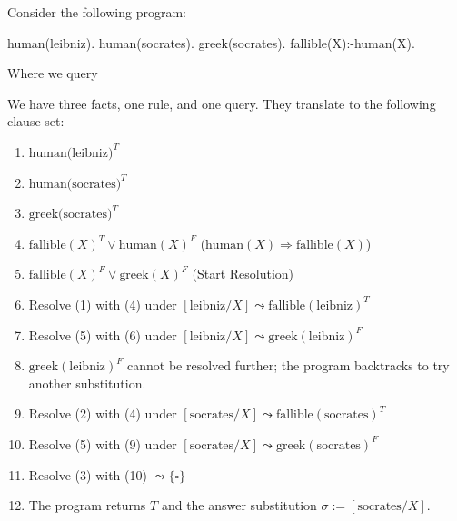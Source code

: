 
\begin{example}{}
Consider the following program:
\begin{codeblock}
human(leibniz).
human(socrates).
greek(socrates).
fallible(X):-human(X).
\end{codeblock}

Where we query 

We have three facts, one rule, and one query. They translate to the following clause set:
\begin{enumerate}
    \item $\text{human(leibniz)}^T$
    \item $\text{human(socrates)}^T$
    \item $\text{greek(socrates)}^T$
    \item $\text{fallible}(X)^T \lor \text{human}(X)^F$ \hfill ($\text{human}(X) \Rightarrow \text{fallible}(X)$)
    \item $\text{fallible}(X)^F \lor \text{greek}(X)^F$ \hfill (Start Resolution)
    \item Resolve (1) with (4) under $[\text{leibniz} / X] \leadsto \text{fallible}(\text{leibniz})^T$
    \item Resolve (5) with (6) under $[\text{leibniz} / X] \leadsto \text{greek}(\text{leibniz})^F$
    \item $\text{greek}(\text{leibniz})^F$ cannot be resolved further; the program backtracks to try another substitution.
    \item Resolve (2) with (4) under $[\text{socrates} / X] \leadsto \text{fallible}(\text{socrates})^T$
    \item Resolve (5) with (9) under $[\text{socrates} / X] \leadsto \text{greek}(\text{socrates})^F$
    \item Resolve (3) with (10) $\leadsto \{ \square \}$
    \item The program returns $T$ and the answer substitution $\sigma := [\text{socrates} / X]$.
\end{enumerate}
\end{example}

